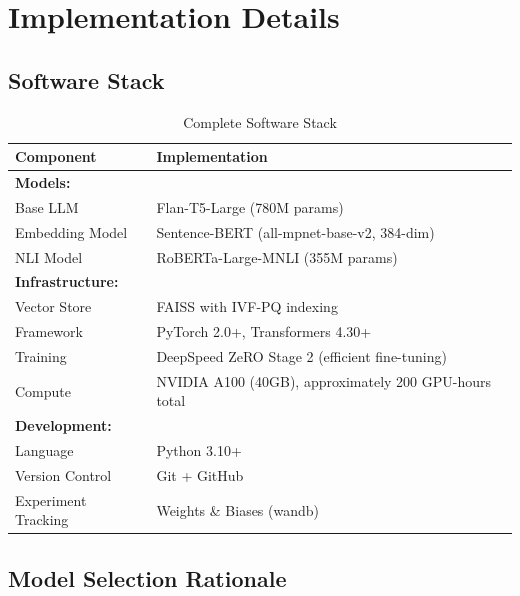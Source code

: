 \documentclass[12pt,a4paper]{article}
\theoremstyle{definition}
\begin{document}
\section{Implementation Details}

\subsection{Software Stack}

\begin{table}[htbp]
\centering
\caption{Complete Software Stack}
\begin{tabular}{ll}
\toprule
\textbf{Component} & \textbf{Implementation} \\
\midrule
\textbf{Models:} & \\
Base LLM & Flan-T5-Large (780M params) \\
Embedding Model & Sentence-BERT (all-mpnet-base-v2, 384-dim) \\
NLI Model & RoBERTa-Large-MNLI (355M params) \\
\midrule
\textbf{Infrastructure:} & \\
Vector Store & FAISS with IVF-PQ indexing \\
Framework & PyTorch 2.0+, Transformers 4.30+ \\
Training & DeepSpeed ZeRO Stage 2 (efficient fine-tuning) \\
Compute & NVIDIA A100 (40GB), approximately 200 GPU-hours total \\
\midrule
\textbf{Development:} & \\
Language & Python 3.10+ \\
Version Control & Git + GitHub \\
Experiment Tracking & Weights \& Biases (wandb) \\
\bottomrule
\end{tabular}
\end{table}

\subsection{Model Selection Rationale}
\end{document}
